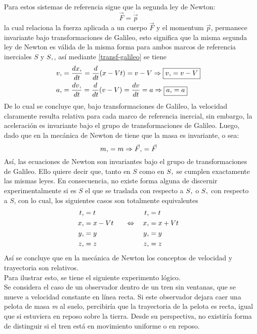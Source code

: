 \documentclass[../main.tex]{subfiles}
\begin{document}
Para estos sistemas de referencia sigue que la segunda ley de Newton:
\begin{equation*}
    \vec{F}=\dot{\vec{p}}
\end{equation*}
la cual relaciona la fuerza aplicada a un cuerpo $\vec{F}$ y el momentum $\vec{p}$, permanece invariante bajo transformaciones de Galileo, esto significa que la misma segunda ley de Newton es válida de la misma forma para ambos marcos de referencia inerciales $S$ y $S\vtick$, así mediante \eqref{transf-galileo} se tiene
\begin{align*}
    v\vtick& = \frac{dx\vtick}{dt}= \frac{d}{dt}(x-Vt)=v-
    V \Rightarrow \boxed{v\vtick=v-V}\\
    a\vtick& =\frac{dv\vtick}{dt}=\frac{d}{dt}(v-V)=\frac{dv}{dt}=a \Rightarrow \boxed{a\vtick=a}
\end{align*}
De lo cual se concluye que, bajo transformaciones de Galileo, la velocidad claramente resulta relativa para cada marco de referencia inercial, sin embargo, la aceleración es invariante bajo el grupo de transformaciones de Galileo. Luego, dado que en la mecánica de Newton de tiene que la masa es invariante, o sea:
\begin{equation*}
    m\vtick=m \Rightarrow \vec{F}\vtick=\vec{F}
\end{equation*}
Así, las ecuaciones de Newton son invariantes bajo el grupo de transformaciones de Galileo. Ello quiere decir que, tanto en $S$ como en $S\vtick$ se cumplen exactamente las mismas leyes. En consecuencia, no existe forma alguna de discernir experimentalmente si es $S$ el que se traslada con respecto a $S\vtick$ o $S\vtick$ con respecto a $S$, con lo cual, los siguientes casos son totalmente equivalentes
\begin{equation}
    \begin{aligned}
        t\vtick &= t \quad & t\vtick &= t \\
        x\vtick &= x - Vt \quad & \Leftrightarrow \quad x\vtick &= x + Vt \\
        y\vtick &= y \quad & y\vtick &= y \\
        z\vtick &= z \quad & z\vtick &= z
    \end{aligned}
\end{equation}
Así se concluye que en la mecánica de Newton los conceptos de velocidad y trayectoria son relativos. \\
Para ilustrar esto, se tiene el siguiente experimento lógico. \\
Se considera el caso de un observador dentro de un tren sin ventanas, que se mueve a velocidad constante en línea recta. Si este observador dejara caer una pelota de masa \emph{m}  al suelo, percibiría que la trayectoria de la pelota es recta, igual que si estuviera en reposo sobre la tierra. Desde su perspectiva, no existiría forma de distinguir si el tren está en movimiento uniforme o en reposo. \\
\end{document}
